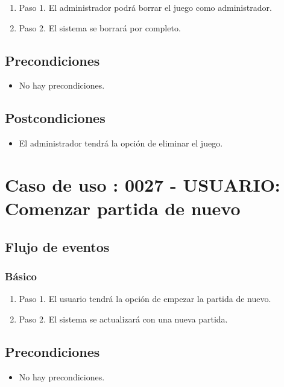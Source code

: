 \begin{enumerate}
\item Paso 1.
El administrador podrá borrar el juego como administrador. 
\item Paso 2.
El sistema se borrará por completo. 
\end{enumerate}

\subsection{Precondiciones}
\begin{itemize}
\item No hay precondiciones.
\end{itemize}

\subsection{Postcondiciones}
\begin{itemize}
\item El administrador tendrá la opción de eliminar el juego.
\end{itemize}



\section{Caso de uso : 0027 - USUARIO: Comenzar partida de nuevo}\label{sec:uc0}
\subsection{Flujo de eventos}
\subsubsection{Básico}

\begin{enumerate}
\item Paso 1.
El usuario tendrá la opción de empezar la partida de nuevo. 
\item Paso 2.
El sistema se actualizará con una nueva partida. 
\end{enumerate}

\subsection{Precondiciones}
\begin{itemize}
\item No hay precondiciones.
\end{itemize}


